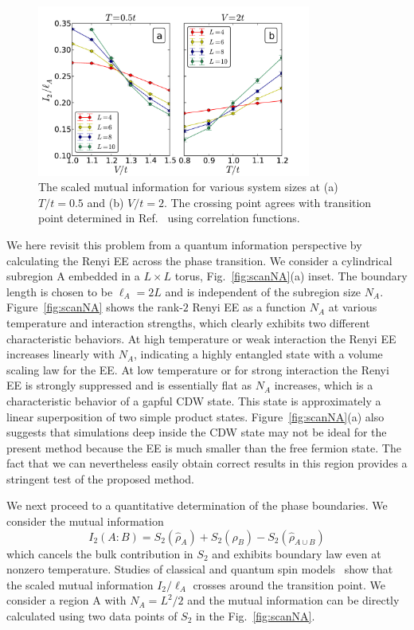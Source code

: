 \documentclass[12pt,onecolumn,english,prl,showpacs,nofootinbib]{revtex4-1}
\begin{document}
\begin{figure}[t]
\centering
\includegraphics[width=9cm]{MI.pdf}
\caption{The scaled mutual information for various system sizes at (a) $T/t=0.5$ and (b) $V/t=2$. The crossing point agrees with transition point determined in Ref.~\cite{Gubernatis:1985wo} using correlation functions.}
\label{fig:MI}
\end{figure}


We here revisit this problem from a quantum information perspective by calculating the Renyi EE across the phase transition. We consider a cylindrical subregion A embedded in a $L\times L$ torus,  Fig.~\ref{fig:scanNA}(a) inset. The boundary length is chosen to be $\ell_{A} =2L$ and is independent of the subregion size $N_{A}$. Figure~\ref{fig:scanNA} shows the rank-$2$ Renyi EE as a function $N_{A}$ at various temperature and interaction strengths, which clearly exhibits two different characteristic behaviors. At high temperature or weak interaction the Renyi EE increases linearly with $N_{A}$, indicating a highly entangled state with a volume scaling law for the EE. At low temperature or for strong interaction the Renyi EE is strongly suppressed and is essentially flat  as $N_{A}$ increases, which is a characteristic behavior of a gapful CDW state. This state is approximately a linear superposition of two simple product states. Figure~\ref{fig:scanNA}(a) also suggests that simulations deep inside the CDW state may not be ideal for the present method because the EE is much smaller than the free fermion state. The fact that we can nevertheless easily obtain correct results in this region provides a stringent test of the proposed method.

We next proceed to a quantitative determination of the phase boundaries. We consider the  mutual information~\cite{Wolf:2008hta, Melko:2010jda}
\begin{equation}
I_{2}(A:B) = S_{2}(\hat{\rho}_{A}) + S_{2}(\hat{\rho}_{B}) - S_{2}(\hat{\rho}_{A\cup B}) 
\label{eq:MI}
\end{equation} 
which cancels the bulk contribution in $S_{2}$ and exhibits boundary law even at nonzero temperature. Studies of classical and quantum spin models~\cite{Melko:2010jda, PhysRevLett.106.135701,  Iaconis:2013jz, PhysRevE.89.012125} show that the scaled mutual information $I_{2}/\ell_{A}$ crosses around the transition point. We consider a region A with $N_{A}=L^{2}/2$ and the mutual information can be directly calculated using two data points of $S_{2}$ in the Fig.~\ref{fig:scanNA}. 
\end{document}
